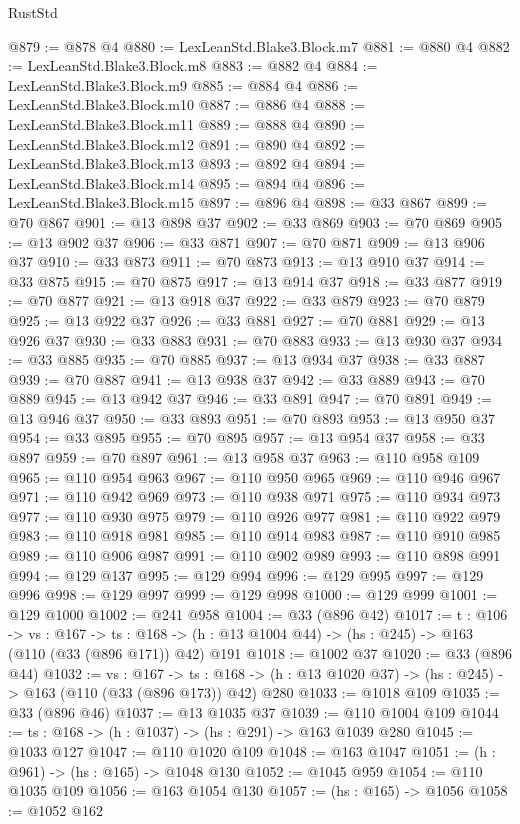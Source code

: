 \begin{lexlean}{RustStd}
\begin{coremodule}
{\begin{coremodule}
{{{{{@879 := @878 @4
@880 := LexLeanStd.Blake3.Block.m7
@881 := @880 @4
@882 := LexLeanStd.Blake3.Block.m8
@883 := @882 @4
@884 := LexLeanStd.Blake3.Block.m9
@885 := @884 @4
@886 := LexLeanStd.Blake3.Block.m10
@887 := @886 @4
@888 := LexLeanStd.Blake3.Block.m11
@889 := @888 @4
@890 := LexLeanStd.Blake3.Block.m12
@891 := @890 @4
@892 := LexLeanStd.Blake3.Block.m13
@893 := @892 @4
@894 := LexLeanStd.Blake3.Block.m14
@895 := @894 @4
@896 := LexLeanStd.Blake3.Block.m15
@897 := @896 @4
@898 := @33 @867
@899 := @70 @867
@901 := @13 @898 @37
@902 := @33 @869
@903 := @70 @869
@905 := @13 @902 @37
@906 := @33 @871
@907 := @70 @871
@909 := @13 @906 @37
@910 := @33 @873
@911 := @70 @873
@913 := @13 @910 @37
@914 := @33 @875
@915 := @70 @875
@917 := @13 @914 @37
@918 := @33 @877
@919 := @70 @877
@921 := @13 @918 @37
@922 := @33 @879
@923 := @70 @879
@925 := @13 @922 @37
@926 := @33 @881
@927 := @70 @881
@929 := @13 @926 @37
@930 := @33 @883
@931 := @70 @883
@933 := @13 @930 @37
@934 := @33 @885
@935 := @70 @885
@937 := @13 @934 @37
@938 := @33 @887
@939 := @70 @887
@941 := @13 @938 @37
@942 := @33 @889
@943 := @70 @889
@945 := @13 @942 @37
@946 := @33 @891
@947 := @70 @891
@949 := @13 @946 @37
@950 := @33 @893
@951 := @70 @893
@953 := @13 @950 @37
@954 := @33 @895
@955 := @70 @895
@957 := @13 @954 @37
@958 := @33 @897
@959 := @70 @897
@961 := @13 @958 @37
@963 := @110 @958 @109
@965 := @110 @954 @963
@967 := @110 @950 @965
@969 := @110 @946 @967
@971 := @110 @942 @969
@973 := @110 @938 @971
@975 := @110 @934 @973
@977 := @110 @930 @975
@979 := @110 @926 @977
@981 := @110 @922 @979
@983 := @110 @918 @981
@985 := @110 @914 @983
@987 := @110 @910 @985
@989 := @110 @906 @987
@991 := @110 @902 @989
@993 := @110 @898 @991
@994 := @129 @137
@995 := @129 @994
@996 := @129 @995
@997 := @129 @996
@998 := @129 @997
@999 := @129 @998
@1000 := @129 @999
@1001 := @129 @1000
@1002 := @241 @958
@1004 := @33 (@896 @42)
@1017 := {t : @106} ->
  {vs : @167} ->
  {ts : @168} -> (h : @13 @1004 @44) -> (hs : @245) -> @163 (@110 (@33 (@896 @171)) @42) @191
@1018 := @1002 @37
@1020 := @33 (@896 @44)
@1032 := {vs : @167} ->
  {ts : @168} -> (h : @13 @1020 @37) -> (hs : @245) -> @163 (@110 (@33 (@896 @173)) @42) @280
@1033 := @1018 @109
@1035 := @33 (@896 @46)
@1037 := @13 @1035 @37
@1039 := @110 @1004 @109
@1044 := {ts : @168} -> (h : @1037) -> (hs : @291) -> @163 @1039 @280
@1045 := @1033 @127
@1047 := @110 @1020 @109
@1048 := @163 @1047
@1051 := (h : @961) -> (hs : @165) -> @1048 @130
@1052 := @1045 @959
@1054 := @110 @1035 @109
@1056 := @163 @1054 @130
@1057 := (hs : @165) -> @1056
@1058 := @1052 @162
}}}}}
\end{coremodule}}
\end{coremodule}
\end{lexlean}
